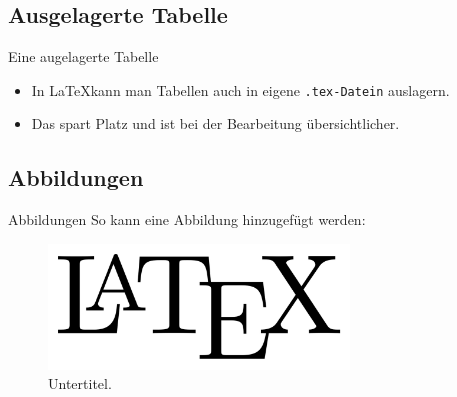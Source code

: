 \subsection{Ausgelagerte Tabelle}

\begin{frame}{Eine augelagerte Tabelle}
  \begin{itemize}[label=\textbullet]
    \item In \LaTeX kann man Tabellen auch in eigene \texttt{.tex-Datein} auslagern.
    \item Das spart Platz und ist bei der Bearbeitung übersichtlicher.
  \end{itemize}
  
  
  
\end{frame}


\subsection{Abbildungen}

\begin{frame}{Abbildungen}
  So kann eine Abbildung hinzugefügt werden:
  \begin{figure}
  \includegraphics[width=8cm]{images/latex_logo.png}
  \caption{Untertitel.}
  \end{figure}
\end{frame}
